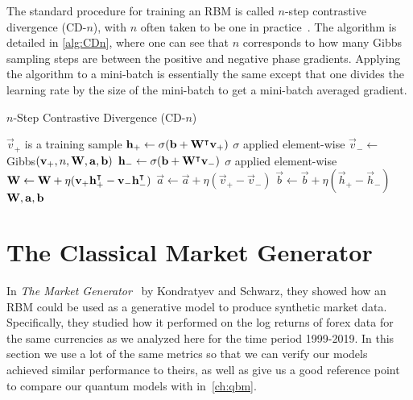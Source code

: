 The standard procedure for training an RBM is called \( n \)-step contrastive divergence (CD-\( n \)), with \( n \) often taken to be one in practice~\cite{hinton_rbm_training}.
The algorithm is detailed in \cref{alg:CDn}, where one can see that \( n \) corresponds to how many Gibbs sampling steps are between the positive and negative phase gradients.
Applying the algorithm to a mini-batch is essentially the same except that one divides the learning rate by the size of the mini-batch to get a mini-batch averaged gradient.

\begin{algorithm}
\caption{$n$-Step Contrastive Divergence (CD-$n$)}
\begin{algorithmic}[1]
        \Comment $\vec{v}_+$ is a training sample
        \State $\mathbf{h}_+ \gets \sigma(\mathbf{b} + \mathbf{W}^\intercal\mathbf{v}_+)$
            \Comment $\sigma$ applied element-wise
        \State $\vec{v}_- \gets$ Gibbs$(\mathbf{v}_+,n,\mathbf{W},\mathbf{a},\mathbf{b})$
        \State $\mathbf{h}_- \gets \sigma(\mathbf{b} + \mathbf{W}^\intercal\mathbf{v}_-)$
            \Comment $\sigma$ applied element-wise
        \State $\mathbf{W} \gets \mathbf{W} + \eta(\mathbf{v}_+ \mathbf{h}_+^\intercal - \mathbf{v}_- \mathbf{h}_-^\intercal)$
        \State $\vec{a} \gets \vec{a} + \eta(\vec{v}_+ - \vec{v}_-)$
        \State $\vec{b} \gets \vec{b} + \eta(\vec{h}_+ - \vec{h}_-)$
        \State \Return $\mathbf{W}, \mathbf{a}, \mathbf{b}$
    \EndProcedure
\end{algorithmic}
\label{alg:CDn}
\end{algorithm}


\section{The Classical Market Generator}\label{sec:classical_market_generator}
In \textit{The Market Generator}~\cite{kondratyev_2019} by Kondratyev and Schwarz, they showed how an RBM could be used as a generative model to produce synthetic market data.
Specifically, they studied how it performed on the log returns of forex data for the same currencies as we analyzed here for the time period 1999-2019.
In this section we use a lot of the same metrics so that we can verify our models achieved similar performance to theirs, as well as give us a good reference point to compare our quantum models with in~\cref{ch:qbm}.

